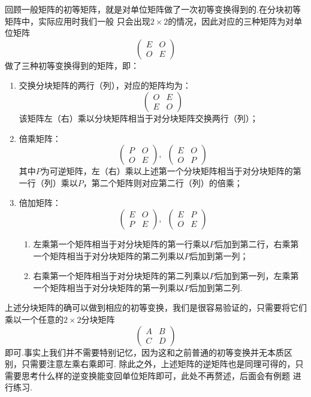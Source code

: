 回顾一般矩阵的初等矩阵，就是对单位矩阵做了一次初等变换得到的.在分块初等矩阵中，实际应用时我们一般
只会出现$2\times 2$的情况，因此对应的三种矩阵为对单位矩阵
\[\begin{pmatrix}
    E & O \\ O & E
\end{pmatrix}\]做了三种初等变换得到的矩阵，即：
\begin{enumerate}
    \item 交换分块矩阵的两行（列），对应的矩阵均为：
    \[\begin{pmatrix}
        O & E \\ E & O
    \end{pmatrix}\]
    该矩阵左（右）乘以分块矩阵相当于对分块矩阵交换两行（列）；
    \item 倍乘矩阵：
    \[\begin{pmatrix}
        P & O \\ O & E
    \end{pmatrix},\enspace\begin{pmatrix}
        E & O \\ O & P
    \end{pmatrix}\]
    其中$P$为可逆矩阵，左（右）乘以上述第一个分块矩阵相当于对分块矩阵的第一行（列）乘以$P$，第二个矩阵则对应第二行（列）的倍乘；
    \item 倍加矩阵：
    \[\begin{pmatrix}
        E & O \\ P & E
    \end{pmatrix},\enspace\begin{pmatrix}
        E & P \\ O & E
    \end{pmatrix}\]
    \begin{enumerate}
        \item 左乘第一个矩阵相当于对分块矩阵的第一行乘以$P$后加到第二行，右乘第一个矩阵相当于对分块矩阵的第二列乘以$P$后加到第一列；
        \item 右乘第一个矩阵相当于对分块矩阵的第二列乘以$P$后加到第一列，左乘第一个矩阵相当于对分块矩阵的第一列乘以$P$后加到第二列.
    \end{enumerate}
\end{enumerate}
上述分块矩阵的确可以做到相应的初等变换，我们是很容易验证的，只需要将它们乘以一个任意的$2\times 2$分块矩阵
\[\begin{pmatrix}
    A & B \\ C & D
\end{pmatrix}\]即可.事实上我们并不需要特别记忆，因为这和之前普通的初等变换并无本质区别，只需要注意左乘右乘即可.
除此之外，上述矩阵的逆矩阵也是同理可得的，只需要思考什么样的逆变换能变回单位矩阵即可，此处不再赘述，后面会有例题
进行练习.

